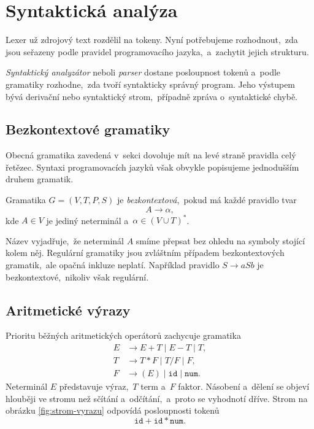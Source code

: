 \section{Syntaktická analýza}\label{sec:syntakticka-analyza}

Lexer už zdrojový text rozdělil na tokeny. Nyní potřebujeme rozhodnout,~zda jsou seřazeny podle pravidel programovacího jazyka,~a~zachytit jejich strukturu.

\emph{Syntaktický analyzátor} neboli \emph{parser} dostane posloupnost tokenů a~podle gramatiky rozhodne,~zda tvoří syntakticky správný program. Jeho výstupem bývá derivační nebo syntaktický strom,~případně zpráva o~syntaktické chybě.

\subsection{Bezkontextové gramatiky}

Obecná gramatika zavedená v~sekci  dovoluje mít na levé straně pravidla celý řetězec. Syntaxi programovacích jazyků však obvykle popisujeme jednodušším druhem gramatik.

\begin{definition}
    Gramatika $G=(V,T,P,S)$ je \emph{bezkontextová},~pokud má každé pravidlo tvar
    \[
        A\to\alpha,
    \]
    kde $A\in V$ je jediný neterminál a~$\alpha\in(V\cup T)^*$.
\end{definition}

Název vyjadřuje,~že neterminál $A$ smíme přepsat bez ohledu na symboly stojící kolem něj. Regulární gramatiky jsou zvláštním případem bezkontextových gramatik,~ale opačná inkluze neplatí. Například pravidlo $S\to aSb$ je bezkontextové,~nikoliv však regulární.

\subsection{Aritmetické výrazy}

Prioritu běžných aritmetických operátorů zachycuje gramatika
\[
\begin{aligned}
    E&\to E+T\mid E-T\mid T,\\
    T&\to T*F\mid T/F\mid F,\\
    F&\to (E)\mid\texttt{id}\mid\texttt{num}.
\end{aligned}
\]
Neterminál $E$ představuje výraz,~$T$ term a~$F$ faktor. Násobení a~dělení se objeví hlouběji ve stromu než sčítání a~odčítání,~a~proto se vyhodnotí dříve. Strom na obrázku \ref{fig:strom-vyrazu} odpovídá posloupnosti tokenů
\[
    \texttt{id}+\texttt{id}*\texttt{num}.
\]

